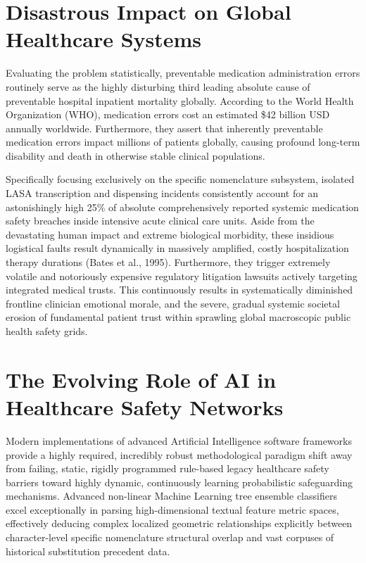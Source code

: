 \documentclass[12pt,a4paper]{report}
\begin{document}
\section{Disastrous Impact on Global Healthcare Systems}
Evaluating the problem statistically, preventable medication administration errors routinely serve as the highly disturbing third leading absolute cause of preventable hospital inpatient mortality globally. According to the World Health Organization (WHO), medication errors cost an estimated \$42 billion USD annually worldwide. Furthermore, they assert that inherently preventable medication errors impact millions of patients globally, causing profound long-term disability and death in otherwise stable clinical populations.

Specifically focusing exclusively on the specific nomenclature subsystem, isolated LASA transcription and dispensing incidents consistently account for an astonishingly high 25\% of absolute comprehensively reported systemic medication safety breaches inside intensive acute clinical care units. Aside from the devastating human impact and extreme biological morbidity, these insidious logistical faults result dynamically in massively amplified, costly hospitalization therapy durations (Bates et al., 1995). Furthermore, they trigger extremely volatile and notoriously expensive regulatory litigation lawsuits actively targeting integrated medical trusts. This continuously results in systematically diminished frontline clinician emotional morale, and the severe, gradual systemic societal erosion of fundamental patient trust within sprawling global macroscopic public health safety grids.

\section{The Evolving Role of AI in Healthcare Safety Networks}
Modern implementations of advanced Artificial Intelligence software frameworks provide a highly required, incredibly robust methodological paradigm shift away from failing, static, rigidly programmed rule-based legacy healthcare safety barriers toward highly dynamic, continuously learning probabilistic safeguarding mechanisms. Advanced non-linear Machine Learning tree ensemble classifiers excel exceptionally in parsing high-dimensional textual feature metric spaces, effectively deducing complex localized geometric relationships explicitly between character-level specific nomenclature structural overlap and vast corpuses of historical substitution precedent data.
\end{document}
